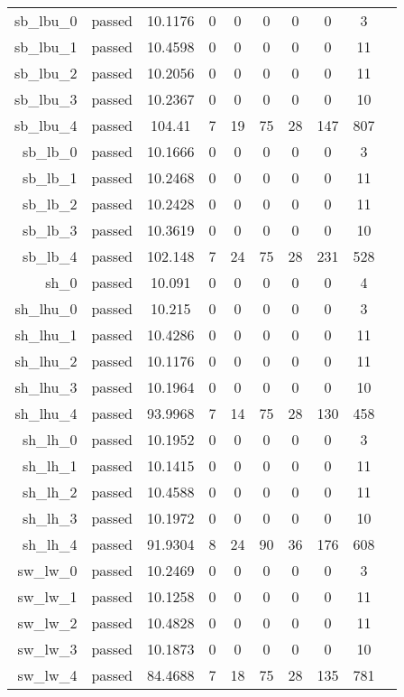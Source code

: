 \begin{longtable}{r|ccccccccc}
    sb\_lbu\_0 & passed & 10.1176 & 0 & 0 & 0 & 0 & 0 & 3 \\
    sb\_lbu\_1 & passed & 10.4598 & 0 & 0 & 0 & 0 & 0 & 11 \\
    sb\_lbu\_2 & passed & 10.2056 & 0 & 0 & 0 & 0 & 0 & 11 \\
    sb\_lbu\_3 & passed & 10.2367 & 0 & 0 & 0 & 0 & 0 & 10 \\
    sb\_lbu\_4 & passed & 104.41 & 7 & 19 & 75 & 28 & 147 & 807 \\
    sb\_lb\_0 & passed & 10.1666 & 0 & 0 & 0 & 0 & 0 & 3 \\
    sb\_lb\_1 & passed & 10.2468 & 0 & 0 & 0 & 0 & 0 & 11 \\
    sb\_lb\_2 & passed & 10.2428 & 0 & 0 & 0 & 0 & 0 & 11 \\
    sb\_lb\_3 & passed & 10.3619 & 0 & 0 & 0 & 0 & 0 & 10 \\
    sb\_lb\_4 & passed & 102.148 & 7 & 24 & 75 & 28 & 231 & 528 \\
    sh\_0 & passed & 10.091 & 0 & 0 & 0 & 0 & 0 & 4 \\
    sh\_lhu\_0 & passed & 10.215 & 0 & 0 & 0 & 0 & 0 & 3 \\
    sh\_lhu\_1 & passed & 10.4286 & 0 & 0 & 0 & 0 & 0 & 11 \\
    sh\_lhu\_2 & passed & 10.1176 & 0 & 0 & 0 & 0 & 0 & 11 \\
    sh\_lhu\_3 & passed & 10.1964 & 0 & 0 & 0 & 0 & 0 & 10 \\
    sh\_lhu\_4 & passed & 93.9968 & 7 & 14 & 75 & 28 & 130 & 458 \\
    sh\_lh\_0 & passed & 10.1952 & 0 & 0 & 0 & 0 & 0 & 3 \\
    sh\_lh\_1 & passed & 10.1415 & 0 & 0 & 0 & 0 & 0 & 11 \\
    sh\_lh\_2 & passed & 10.4588 & 0 & 0 & 0 & 0 & 0 & 11 \\
    sh\_lh\_3 & passed & 10.1972 & 0 & 0 & 0 & 0 & 0 & 10 \\
    sh\_lh\_4 & passed & 91.9304 & 8 & 24 & 90 & 36 & 176 & 608 \\
    sw\_lw\_0 & passed & 10.2469 & 0 & 0 & 0 & 0 & 0 & 3 \\
    sw\_lw\_1 & passed & 10.1258 & 0 & 0 & 0 & 0 & 0 & 11 \\
    sw\_lw\_2 & passed & 10.4828 & 0 & 0 & 0 & 0 & 0 & 11 \\
    sw\_lw\_3 & passed & 10.1873 & 0 & 0 & 0 & 0 & 0 & 10 \\
    sw\_lw\_4 & passed & 84.4688 & 7 & 18 & 75 & 28 & 135 & 781 \\

\end{longtable}
